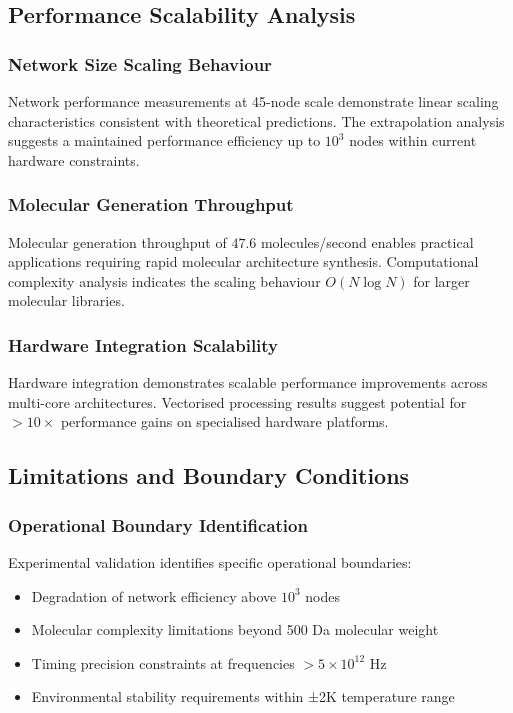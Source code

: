 \documentclass[12pt,a4paper]{article}
\begin{document}
\subsection{Performance Scalability Analysis}

\subsubsection{Network Size Scaling Behaviour}

Network performance measurements at 45-node scale demonstrate linear scaling characteristics consistent with theoretical predictions. The extrapolation analysis suggests a maintained performance efficiency up to $10^3$ nodes within current hardware constraints.

\subsubsection{Molecular Generation Throughput}

Molecular generation throughput of $47.6$ molecules/second enables practical applications requiring rapid molecular architecture synthesis. Computational complexity analysis indicates the scaling behaviour $O(N \log N)$ for larger molecular libraries.

\subsubsection{Hardware Integration Scalability}

Hardware integration demonstrates scalable performance improvements across multi-core architectures. Vectorised processing results suggest potential for $> 10 \times$ performance gains on specialised hardware platforms.

\subsection{Limitations and Boundary Conditions}

\subsubsection{Operational Boundary Identification}

Experimental validation identifies specific operational boundaries:

\begin{itemize}
\item Degradation of network efficiency above $10^3$ nodes
\item Molecular complexity limitations beyond 500 Da molecular weight  
\item Timing precision constraints at frequencies $> 5 \times 10^{12}$ Hz
\item Environmental stability requirements within ±2K temperature range
\end{itemize}
\end{document}
